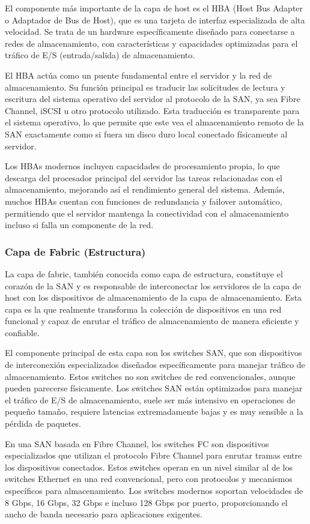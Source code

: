 El componente más importante de la capa de host es el HBA (Host Bus Adapter o Adaptador de Bus de Host), que es una tarjeta de interfaz especializada de alta velocidad. Se trata de un hardware específicamente diseñado para conectarse a redes de almacenamiento, con características y capacidades optimizadas para el tráfico de E/S (entrada/salida) de almacenamiento.

El HBA actúa como un puente fundamental entre el servidor y la red de almacenamiento. Su función principal es traducir las solicitudes de lectura y escritura del sistema operativo del servidor al protocolo de la SAN, ya sea Fibre Channel, iSCSI u otro protocolo utilizado. Esta traducción es transparente para el sistema operativo, lo que permite que este vea el almacenamiento remoto de la SAN exactamente como si fuera un disco duro local conectado físicamente al servidor.

Los HBAs modernos incluyen capacidades de procesamiento propia, lo que descarga del procesador principal del servidor las tareas relacionadas con el almacenamiento, mejorando así el rendimiento general del sistema. Además, muchos HBAs cuentan con funciones de redundancia y failover automático, permitiendo que el servidor mantenga la conectividad con el almacenamiento incluso si falla un componente de la red.

\subsubsection{Capa de Fabric (Estructura)}
La capa de fabric, también conocida como capa de estructura, constituye el corazón de la SAN y es responsable de interconectar los servidores de la capa de host con los dispositivos de almacenamiento de la capa de almacenamiento. Esta capa es la que realmente transforma la colección de dispositivos en una red funcional y capaz de enrutar el tráfico de almacenamiento de manera eficiente y confiable.

El componente principal de esta capa son los switches SAN, que son dispositivos de interconexión especializados diseñados específicamente para manejar tráfico de almacenamiento. Estos switches no son switches de red convencionales, aunque pueden parecerse físicamente. Los switches SAN están optimizados para manejar el tráfico de E/S de almacenamiento, suele ser más intensivo en operaciones de pequeño tamaño, requiere latencias extremadamente bajas y es muy sensible a la pérdida de paquetes.

En una SAN basada en Fibre Channel, los switches FC son dispositivos especializados que utilizan el protocolo Fibre Channel para enrutar tramas entre los dispositivos conectados. Estos switches operan en un nivel similar al de los switches Ethernet en una red convencional, pero con protocolos y mecanismos específicos para almacenamiento. Los switches modernos soportan velocidades de 8 Gbps, 16 Gbps, 32 Gbps e incluso 128 Gbps por puerto, proporcionando el ancho de banda necesario para aplicaciones exigentes.

